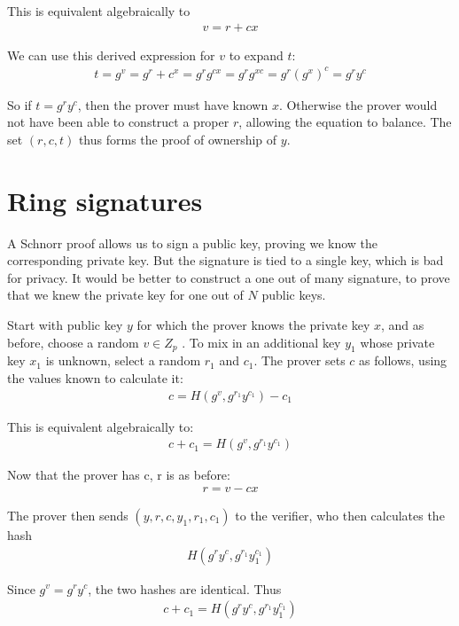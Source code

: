 \documentclass{article}
\begin{document}
This is equivalent algebraically to
\begin{eqnarray}
  v = r + cx
\end{eqnarray}

We can use this derived expression for $v$ to expand $t$:
\begin{eqnarray}
  t = g^v= g^r + c^x = g^r g^{cx} = g^r g^{xc} = g^r (g^x)^c = g^r y^c
\end{eqnarray}

So if $t = g^r y^c$, then the prover must have known $x$.  Otherwise the prover would not have been able to construct a proper $r$, allowing the equation to balance.  The set $(r,c,t)$ thus forms the proof of ownership of $y$.



\section{Ring signatures}

A Schnorr proof allows us to sign a public key, proving we know the corresponding private key.  But the signature is tied to a single key, which is bad for privacy.  It would be better to construct a one out of many signature, to prove that we knew the private key for one out of $N$ public keys.

Start with public key $y$ for which the prover knows the private key $x$, and as before, choose a random $v \in Z_p$ . To mix in an additional key $y_1$ whose private key $x_1$ is unknown, select a random $r_1$ and $c_1$.  The prover sets $c$ as follows, using the values known to calculate it:
\begin{eqnarray}
  c = H(g^v, g^{r_1} y^{c_1}) - c_1
\end{eqnarray}

This is equivalent algebraically to:
\begin{eqnarray}
  c + c_1 = H(g^v, g^{r_1} y^{c_1})
\end{eqnarray}

Now that the prover has c, r is as before:
\begin{eqnarray}
  r = v - cx
\end{eqnarray}

The prover then sends $(y, r, c, y_1, r_1, c_1)$ to the verifier, who then calculates the hash
\begin{eqnarray}
  H(g^r y^c, g^{r_1} y_1^{c_1})
\end{eqnarray}

Since $g^v = g^r y^c$, the two hashes are identical.  Thus 
\begin{eqnarray}
  c + c_1 = H(g^r y^c, g^{r_1} y_1^{c_1})
\end{eqnarray}
\end{document}
